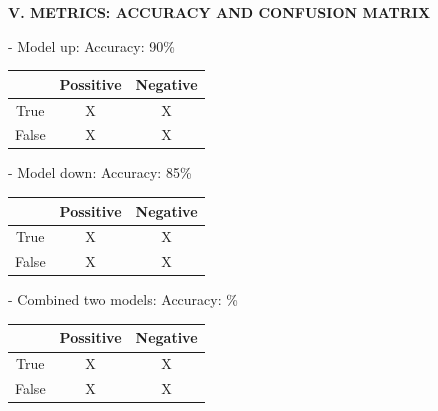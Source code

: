 \documentclass[12pt,a4paper,twoside]{article}
\begin{document}
	\begin{flushleft}
		\textbf{V. METRICS: ACCURACY AND CONFUSION MATRIX }
		\begin{flushleft}
			\begin{flushleft}
			- Model up: Accuracy: 90\%
			\medskip
			\end{flushleft}
			\begin{tabular}{ |c|c|c| }
				\hline
 				& Possitive & Negative \\ 
 				\hline
 				True & X & X \\  
 				False & X & X \\ 
 				\hline  
			\end{tabular}
		\end{flushleft}
		\begin{flushleft}
			\begin{flushleft}
			- Model down: Accuracy: 85\%
			\medskip
			\end{flushleft}
			\begin{tabular}{ |c|c|c| }
				\hline
 				& Possitive & Negative \\ 
 				\hline
 				True & X & X \\  
 				False & X & X \\ 
 				\hline  
			\end{tabular}
		\end{flushleft}
		\begin{flushleft}
			\begin{flushleft}
			- Combined two models: Accuracy: \%
			\medskip
			\end{flushleft}
			\begin{tabular}{ |c|c|c| }
				\hline
 				& Possitive & Negative \\ 
 				\hline
 				True & X & X \\  
 				False & X & X \\ 
 				\hline  
			\end{tabular}
		\end{flushleft}
	\end{flushleft}
	\bigskip
\end{document}
